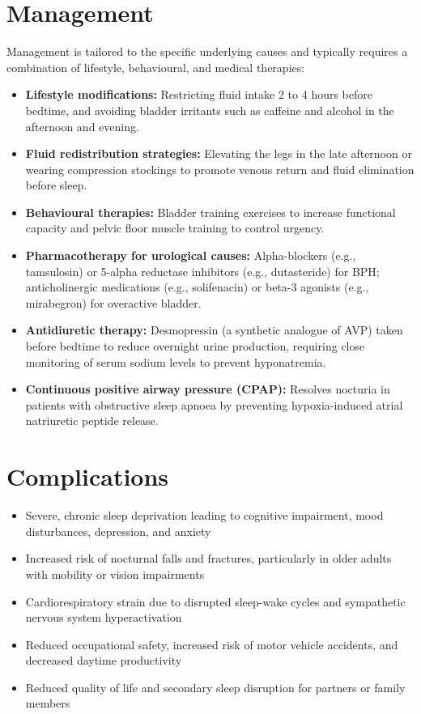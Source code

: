 \section*{Management}
Management is tailored to the specific underlying causes and typically requires a combination of lifestyle, behavioural, and medical therapies:
\begin{itemize}
    \item \textbf{Lifestyle modifications:} Restricting fluid intake 2 to 4 hours before bedtime, and avoiding bladder irritants such as caffeine and alcohol in the afternoon and evening.
    \item \textbf{Fluid redistribution strategies:} Elevating the legs in the late afternoon or wearing compression stockings to promote venous return and fluid elimination before sleep.
    \item \textbf{Behavioural therapies:} Bladder training exercises to increase functional capacity and pelvic floor muscle training to control urgency.
    \item \textbf{Pharmacotherapy for urological causes:} Alpha-blockers (e.g., tamsulosin) or 5-alpha reductase inhibitors (e.g., dutasteride) for BPH; anticholinergic medications (e.g., solifenacin) or beta-3 agonists (e.g., mirabegron) for overactive bladder.
    \item \textbf{Antidiuretic therapy:} Desmopressin (a synthetic analogue of AVP) taken before bedtime to reduce overnight urine production, requiring close monitoring of serum sodium levels to prevent hyponatremia.
    \item \textbf{Continuous positive airway pressure (CPAP):} Resolves nocturia in patients with obstructive sleep apnoea by preventing hypoxia-induced atrial natriuretic peptide release.
\end{itemize}

\section*{Complications}
\begin{itemize}
    \item Severe, chronic sleep deprivation leading to cognitive impairment, mood disturbances, depression, and anxiety
    \item Increased risk of nocturnal falls and fractures, particularly in older adults with mobility or vision impairments
    \item Cardiorespiratory strain due to disrupted sleep-wake cycles and sympathetic nervous system hyperactivation
    \item Reduced occupational safety, increased risk of motor vehicle accidents, and decreased daytime productivity
    \item Reduced quality of life and secondary sleep disruption for partners or family members
\end{itemize}


